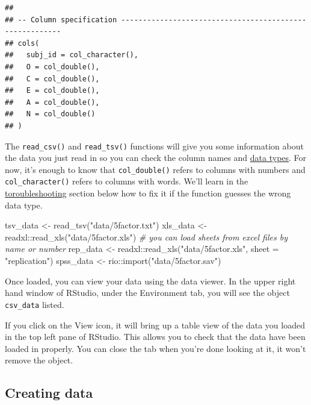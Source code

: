 \documentclass[
  oneside]{book}
\newenvironment{Shaded}{\begin{snugshade}}{\end{snugshade}}
\newcommand{\AttributeTok}[1]{\textcolor[rgb]{0.77,0.63,0.00}{#1}}
\newcommand{\CommentTok}[1]{\textcolor[rgb]{0.56,0.35,0.01}{\textit{#1}}}
\newcommand{\FunctionTok}[1]{\textcolor[rgb]{0.00,0.00,0.00}{#1}}
\newcommand{\NormalTok}[1]{#1}
\newcommand{\OtherTok}[1]{\textcolor[rgb]{0.56,0.35,0.01}{#1}}
\newcommand{\SpecialCharTok}[1]{\textcolor[rgb]{0.00,0.00,0.00}{#1}}
\newcommand{\StringTok}[1]{\textcolor[rgb]{0.31,0.60,0.02}{#1}}
\begin{document}
\begin{verbatim}
## 
## -- Column specification --------------------------------------------------------
## cols(
##   subj_id = col_character(),
##   O = col_double(),
##   C = col_double(),
##   E = col_double(),
##   A = col_double(),
##   N = col_double()
## )
\end{verbatim}

The \texttt{read\_csv()} and \texttt{read\_tsv()} functions will give you some information about the data you just read in so you can check the column names and \protect\hyperlink{data_types}{data types}. For now, it's enough to know that \texttt{col\_double()} refers to columns with numbers and \texttt{col\_character()} refers to columns with words. We'll learn in the \protect\hyperlink{troubleshooting}{toroubleshooting} section below how to fix it if the function guesses the wrong data type.

\begin{Shaded}
\begin{Highlighting}[]
\NormalTok{tsv\_data }\OtherTok{\textless{}{-}} \FunctionTok{read\_tsv}\NormalTok{(}\StringTok{"data/5factor.txt"}\NormalTok{)}
\NormalTok{xls\_data }\OtherTok{\textless{}{-}}\NormalTok{ readxl}\SpecialCharTok{::}\FunctionTok{read\_xls}\NormalTok{(}\StringTok{"data/5factor.xls"}\NormalTok{)}
\CommentTok{\# you can load sheets from excel files by name or number}
\NormalTok{rep\_data }\OtherTok{\textless{}{-}}\NormalTok{ readxl}\SpecialCharTok{::}\FunctionTok{read\_xls}\NormalTok{(}\StringTok{"data/5factor.xls"}\NormalTok{, }\AttributeTok{sheet =} \StringTok{"replication"}\NormalTok{)}
\NormalTok{spss\_data }\OtherTok{\textless{}{-}}\NormalTok{ rio}\SpecialCharTok{::}\FunctionTok{import}\NormalTok{(}\StringTok{"data/5factor.sav"}\NormalTok{)}
\end{Highlighting}
\end{Shaded}

Once loaded, you can view your data using the data viewer. In the upper right hand window of RStudio, under the Environment tab, you will see the object \texttt{csv\_data} listed.

If you click on the View icon, it will bring up a table view of the data you loaded in the top left pane of RStudio. This allows you to check that the data have been loaded in properly. You can close the tab when you're done looking at it, it won't remove the object.

\hypertarget{creating-data}{%
\subsection{Creating data}\label{creating-data}}
\end{document}
